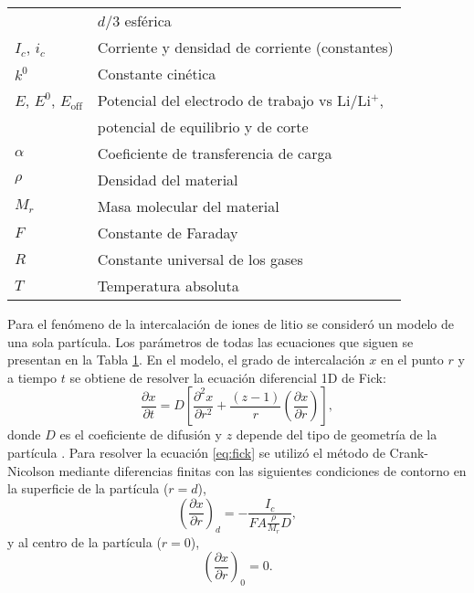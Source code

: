 \begin{table}[h!]
{\begin{tabular}{l l}
                & $d/3$ esférica \\
        $I_c$, $i_c$ & Corriente y densidad de corriente (constantes) \\
        $k^0$ & Constante cinética \\
        $E$, $E^0$, $E_{\text{off}}$ & Potencial del electrodo de trabajo vs Li/Li$^+$,\\
                                     & potencial de equilibrio y de corte \\
        $\alpha$ & Coeficiente de transferencia de carga \\
        $\rho$ & Densidad del material \\
        $M_r$ & Masa molecular del material \\
        $F$ & Constante de Faraday \\
        $R$ & Constante universal de los gases \\
        $T$ & Temperatura absoluta \\
        \bottomrule
    \end{tabular}
    }{}
    \label{t:params}
\end{table}

Para el fenómeno de la intercalación de iones de litio se consideró un modelo de 
una sola partícula. Los parámetros de todas las ecuaciones que siguen se
presentan en la Tabla \ref{t:params}. En el modelo, el grado de intercalación $x$
en el punto $r$ y a tiempo $t$ se obtiene de resolver la ecuación diferencial 1D
de Fick:
\begin{equation}\label{eq:fick}
    \frac{\partial x}{\partial t} = D \left[ \frac{\partial^2 x}{\partial r^2} + \frac{(z - 1)}{r} \left(\frac{\partial x}{\partial r}\right) \right],
\end{equation}
donde $D$ es el coeficiente de difusión y $z$ depende del tipo de geometría de la 
partícula \cite{vassiliev2016}. Para resolver la ecuación \ref{eq:fick} se 
utilizó el método de Crank-Nicolson mediante diferencias finitas 
\cite{crank-nicolson} con las siguientes condiciones de contorno en la superficie
de la partícula ($r = d$),
\begin{equation}
    \left(\frac{\partial x}{\partial r}\right)_d = - \frac{I_c}{F A \frac{\rho}{M_r}D},
\end{equation}
y al centro de la partícula ($r = 0$),
\begin{equation}
    \left(\frac{\partial x}{\partial r}\right)_0 = 0.
\end{equation}

